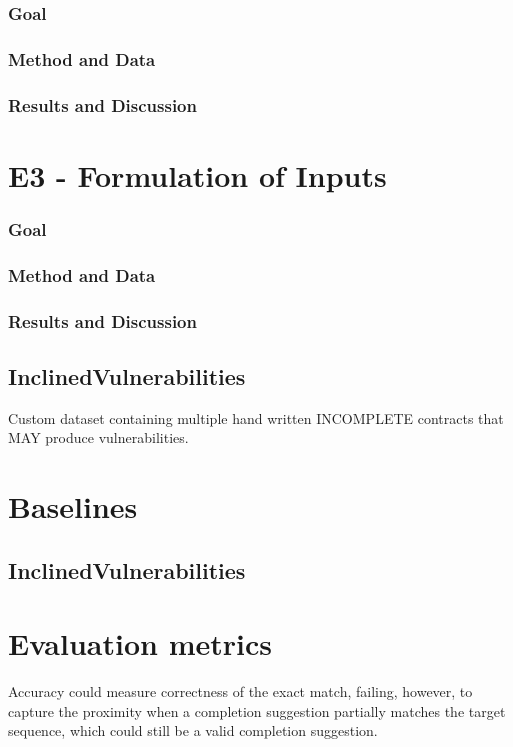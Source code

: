 \subsubsection{Goal}
\subsubsection{Method and Data}
\subsubsection{Results and Discussion}

\section{E3 - Formulation of Inputs}
\label{sec:e3-formulation-of-inputs}

\subsubsection{Goal}
\subsubsection{Method and Data}
\subsubsection{Results and Discussion}




\subsection{InclinedVulnerabilities}
Custom dataset containing multiple hand written INCOMPLETE contracts that MAY produce vulnerabilities.


\section{Baselines}
\subsection{InclinedVulnerabilities}

\section{Evaluation metrics}
Accuracy could measure correctness of the exact match, failing, however, to capture the proximity when a completion suggestion partially matches the target sequence, which could still be a valid completion suggestion.

